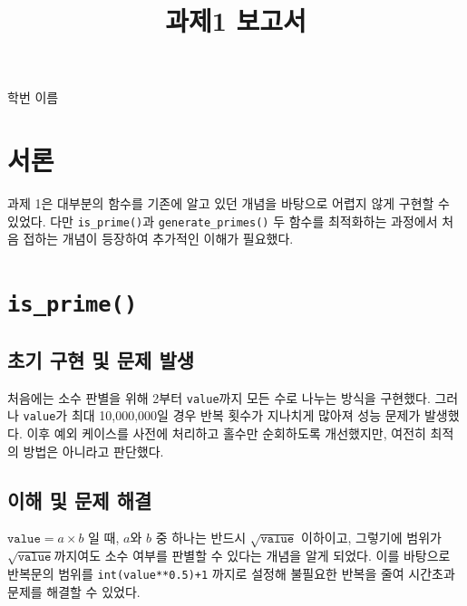 \documentclass[11pt,a4paper]{article}
\makeatletter
\newcommand{\subtitle}[1]{\gdef\@subtitle{#1}}
\newcommand{\studentinfo}[1]{\gdef\@studentinfo{#1}}
\def\@subtitle{}
\def\@studentinfo{}
\renewcommand{\maketitle}{%
  \begin{center}
    {\LARGE\bfseries \@title\par}
    \vspace{0.5em}
    {\large \@subtitle\par}
  \end{center}
  \vspace{-1.0em}
  \begin{flushright}
    \normalsize \@studentinfo
  \end{flushright}
}
\makeatother
\begin{document}
\title{과제1 보고서}

\subtitle{}

\studentinfo{학번 이름}

\maketitle


\section{서론}

    과제 1은 대부분의 함수를 기존에 알고 있던 개념을 바탕으로 어렵지 않게 구현할 수 있었다.
    다만 \texttt{is\_prime()}과 \texttt{generate\_primes()} 두 함수를 최적화하는 과정에서
    처음 접하는 개념이 등장하여 추가적인 이해가 필요했다.


\section{\texttt{is\_prime()}}

    \subsection{초기 구현 및 문제 발생}

        처음에는 소수 판별을 위해 2부터 \texttt{value}까지 모든 수로 나누는 방식을 구현했다.
        그러나 \texttt{value}가 최대 10,000,000일 경우 반복 횟수가 지나치게 많아져 성능 문제가 발생했다.
        이후 예외 케이스를 사전에 처리하고 홀수만 순회하도록 개선했지만, 여전히 최적의 방법은 아니라고 판단했다. 

    \subsection{이해 및 문제 해결}

        $\texttt{value} = a \times b$ 일 때, $a$와 $b$ 중 하나는 반드시
        $\sqrt{\texttt{value}}$ 이하이고, 그렇기에 범위가 $\sqrt{\texttt{value}}$까지여도 소수 여부를 판별할 수 있다는 개념을 알게 되었다.
        이를 바탕으로 반복문의 범위를 \texttt{int(value**0.5)+1} 까지로 설정해 불필요한 반복을 줄여 시간초과 문제를 
        해결할 수 있었다.

\end{document}
